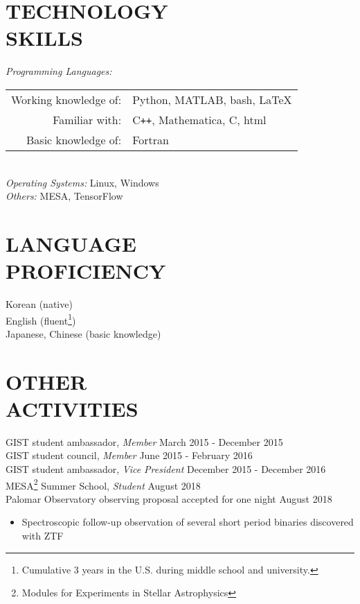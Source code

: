 \documentclass[margin, 10pt]{res} %
\begin{document}
\begin{resume}

\section{TECHNOLOGY \\ SKILLS} 

{\sl Programming Languages:}\\%
\begin{tabular}{rl}
    Working knowledge of:& Python, MATLAB, bash, \LaTeX\\
    Familiar with:& C\texttt{++}, Mathematica, C, html\\
     Basic knowledge of:& Fortran  \\
\end{tabular}\\
{\sl Operating Systems:} Linux, Windows \\
{\sl Others:} MESA, TensorFlow\\
 
\section{LANGUAGE \\ PROFICIENCY} 

Korean (native) \\
English (fluent\footnote{Cumulative 3 years in the U.S. during middle school and university.}) \\
Japanese, Chinese (basic knowledge) \\
 


\section{OTHER \\ ACTIVITIES} 

GIST student ambassador, {\sl Member} \hfill March 2015 - December 2015\\
GIST student council, {\sl Member} \hfill June 2015 - February 2016\\
GIST student ambassador, {\sl Vice President} \hfill December 2015 - December 2016 \\
MESA\footnote{Modules for Experiments in Stellar Astrophysics} Summer School, {\sl Student} \hfill August 2018 \\
Palomar Observatory observing proposal accepted for one night \hfill August 2018
\begin{itemize}
\item[] Spectroscopic follow-up observation of several short period binaries discovered with ZTF
\end{itemize}


\end{resume}
\end{document}
